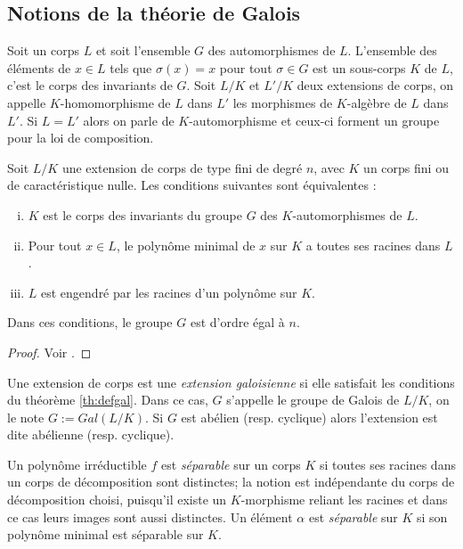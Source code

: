 \documentclass[a4paper]{article} %
\numberwithin{section}{part}
\numberwithin{equation}{section}
\begin{document}
\subsection{Notions de la théorie de Galois}
Soit un corps $L$ et soit l'ensemble $G$ des automorphismes de $L$. L'ensemble 
des éléments de $x\in L$ tels que $\sigma(x) = x$ pour tout $\sigma\in G$ est un
sous-corps $K$ de $L$, c'est le corps des invariants de $G$. Soit $L/K$ et
$L'/K$ deux extensions de corps, on appelle $K$-homomorphisme de $L$ dans $L'$ 
les morphismes de $K$-algèbre de $L$ dans $L'$. Si $L = L'$ alors on parle de
$K$-automorphisme et ceux-ci forment un groupe pour la loi de composition.

\begin{thm}
\label{th:defgal}
Soit $L/K$ une extension de corps de type fini de degré $n$, avec $K$ un corps
fini ou de caractéristique nulle. Les conditions suivantes sont équivalentes :
\begin{enumerate}[(i)]
	\item $K$ est le corps des invariants du groupe $G$ des $K$-automorphismes
de $L$.
	\item Pour tout $x\in L$, le polynôme minimal de $x$ sur $K$ a toutes ses
racines dans $L$.
	\item $L$ est engendré par les racines d'un polynôme sur $K$.
\end{enumerate}
Dans ces conditions, le groupe $G$ est d'ordre égal à $n$.
\end{thm}
\begin{proof}
Voir \cite[p. 101, th. 1]{Sam}.
\end{proof}

\begin{defn}
\label{def:gal}
Une extension de corps est une \emph{extension galoisienne} si elle satisfait 
les conditions du théorème \ref{th:defgal}. Dans ce cas, $G$ s'appelle le groupe
de Galois de $L/K$, on le note $G := Gal(L/K)$. Si $G$ est abélien (resp. 
cyclique) alors l'extension est dite abélienne (resp. cyclique).
\end{defn}

Un polynôme irréductible $f$ est \emph{séparable} sur un corps $K$ si toutes
ses racines dans un corps de décomposition sont distinctes; la notion est
indépendante du corps de décomposition choisi, puisqu'il existe un $K$-morphisme
reliant les racines et dans ce cas leurs images sont aussi distinctes. 
Un élément $\alpha$ est \emph{séparable} sur $K$ si son polynôme minimal est 
séparable sur $K$.
\end{document}
